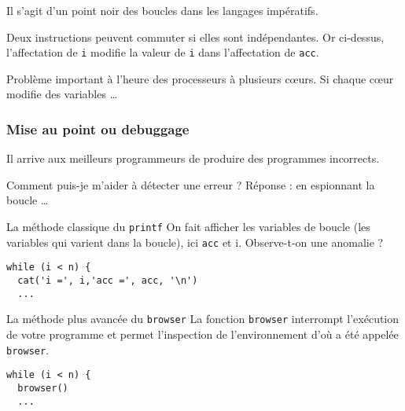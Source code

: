 \documentclass[10pt]{beamer}
\begin{document}
\begin{frame}[fragile]
Il s'agit d'un point noir des boucles dans les langages impératifs.

\begin{alertblock}{Deux instructions peuvent commuter si elles sont indépendantes.}
Or ci-dessus, l'affectation de \texttt{i} modifie la valeur de \texttt{i} dans l'affectation de \texttt{acc}.
\end{alertblock}


\begin{block}{Problème important à l'heure des processeurs à plusieurs c{\oe}urs.}
 Si chaque c{\oe}ur modifie des variables \dots
\end{block}

\end{frame}


\begin{frame}[fragile]
  \frametitle{Mise au point ou debuggage}
  Il arrive aux meilleurs programmeurs de produire des programmes incorrects.
  \begin{alertblock}{Comment puis-je m'aider à détecter une erreur ?}
    Réponse : en espionnant la boucle \dots
  \end{alertblock}

  \begin{block}{La méthode classique du \texttt{printf}}
    On fait afficher les variables de boucle (les variables qui varient dans la boucle), ici \texttt{acc} et {i}. \alert{Observe-t-on une anomalie ?}   
  \begin{lstlisting}
while (i < n) {
  cat('i =', i,'acc =', acc, '\n')
  ...
\end{lstlisting}

\end{block}

    \begin{block}{La méthode plus avancée du \texttt{browser}}
      La fonction \texttt{browser} interrompt l'exécution de votre programme et permet l'inspection de l'environnement d'où a été appelée \texttt{browser}.
  \begin{lstlisting}
while (i < n) {
  browser()
  ...
\end{lstlisting}
\end{block}
\end{frame}
\end{document}
